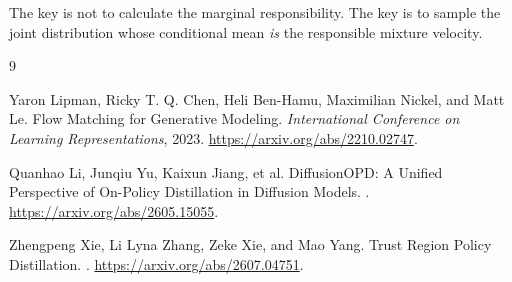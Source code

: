 \documentclass[11pt,a4paper]{article}
\theoremstyle{plain}
\theoremstyle{definition}
\begin{document}
The key is not to calculate the marginal responsibility.  The key is to sample the joint
distribution whose conditional mean \emph{is} the responsible mixture velocity.

\begin{thebibliography}{9}

Yaron Lipman, Ricky T. Q. Chen, Heli Ben-Hamu, Maximilian Nickel, and Matt Le.
\newblock Flow Matching for Generative Modeling.
\newblock \emph{International Conference on Learning Representations}, 2023.
\newblock \url{https://arxiv.org/abs/2210.02747}.

Quanhao Li, Junqiu Yu, Kaixun Jiang, et al.
\newblock DiffusionOPD: A Unified Perspective of On-Policy Distillation in Diffusion Models.
.
\newblock \url{https://arxiv.org/abs/2605.15055}.

Zhengpeng Xie, Li Lyna Zhang, Zeke Xie, and Mao Yang.
\newblock Trust Region Policy Distillation.
.
\newblock \url{https://arxiv.org/abs/2607.04751}.

\end{thebibliography}
\end{document}
